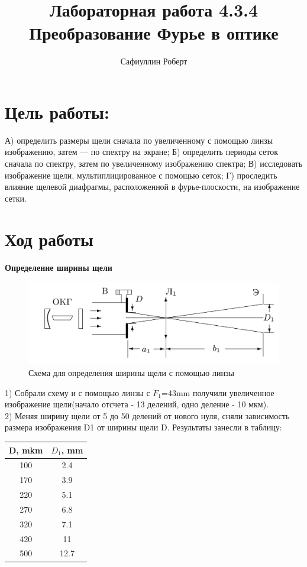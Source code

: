 \documentclass[a4paper,12pt]{article} %
\author{Сафиуллин Роберт	}
\title{Лабораторная работа  4.3.4\\ Преобразование Фурье в оптике}
\begin{document}

\maketitle


\newpage

\section{Цель работы:}
А) определить размеры щели сначала по
увеличенному с помощью линзы изображению, затем
— по спектру на экране; Б) определить периоды сеток сначала по спектру, затем по увеличенному изображению спектра; В) исследовать изображение щели, мультиплицированное с помощью сеток; Г) проследить влияние щелевой
диафрагмы, расположенной в фурье-плоскости, на изображение сетки.
\\


\section{Ход работы}

\textbf{Определение ширины щели}
\begin{figure}[H]
	\centering
	\includegraphics[width = 12 cm]{1.png}
	\caption{Схема для определения ширины щели с помощью линзы}
\end{figure}
 1) Собрали схему и с помощью линзы с $F_1$=43mm получили увеличенное изображение щели(начало отсчета - 13 делений, одно деление - 10 мкм). \\
 
 2) Меняя ширину щели от 5 до 50 делений от нового нуля,
сняли зависимость размера изображения D1 от ширины щели D. Результаты занесли в таблицу:\\
\begin{center}

\begin{tabular}{|c|c|}
\hline 
D, mkm & $D_1$, mm \\ 
\hline 
100 & 2.4 \\ 
\hline 
170 & 3.9 \\ 
\hline 
220 & 5.1 \\ 
\hline 
270 & 6.8 \\ 
\hline 
320 & 7.1 \\ 
\hline 
420 & 11\\ 
\hline 
500 & 12.7 \\ 
\hline 
\end{tabular} 
 \end{center}
\end{document}
